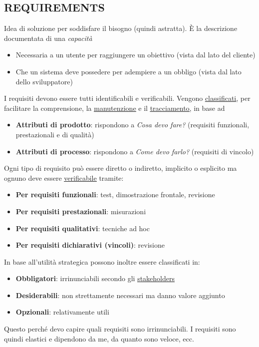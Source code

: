 		\subsection{REQUIREMENTS}  \label{requirements}
		Idea di soluzione per soddisfare il bisogno (quindi astratta).
		È la descrizione documentata di una \textit{capacità}
		\begin{itemize}
			\item Necessaria a un utente per raggiungere un obiettivo (vista dal lato del cliente)
			\item Che un sistema deve possedere per adempiere a un obbligo (vista dal lato dello sviluppatore)
		\end{itemize}
	    I requisiti devono essere tutti identificabili e verificabili. Vengono \underline{\hyperref[classificazione]{classificati}}, per facilitare la comprensione, la \underline{\hyperref[manutenzione]{manutenzione}} e il \underline{\hyperref[tracciamento]{tracciamento}}, in base ad
	    	\begin{itemize}
	    		\item \textbf{Attributi di prodotto}: rispondono a \textit{Cosa devo fare?} (requisiti funzionali, prestazionali e di qualità)
	    		\item \textbf{Attributi di processo}: rispondono a \textit{Come devo farlo?} (requisiti di vincolo)
	    	\end{itemize}
		Ogni tipo di requisito può essere diretto o indiretto, implicito o esplicito ma ognuno deve essere \underline{\hyperref[verificare]{verificabile}} tramite:
		\begin{itemize}
			\item \textbf{Per requisiti funzionali}: test, dimostrazione frontale, revisione
			\item \textbf{Per requisiti prestazionali}: misurazioni
			\item \textbf{Per requisiti qualitativi}: tecniche ad hoc
			\item \textbf{Per requisiti dichiarativi (vincoli)}: revisione
		\end{itemize}
		In base all'utilità strategica possono inoltre essere classificati in:
		\begin{itemize}
			\item \textbf{Obbligatori}: irrinunciabili secondo gli \underline{\hyperref[stakeholder]{stakeholders}}
			\item \textbf{Desiderabili}: non strettamente necessari ma danno valore aggiunto
			\item \textbf{Opzionali}: relativamente utili
		\end{itemize}
		Questo perché devo capire quali requisiti sono irrinunciabili. I requisiti sono quindi elastici e dipendono da me, da quanto sono veloce, ecc.

